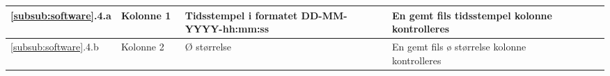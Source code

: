 \begin{center}
\begin{longtable}{ | m{1.785cm} | m{1.785cm}| m{1.785cm}| m{1.785cm}| m{1.785cm}| m{1.785cm}|m{1.785cm}| }
			\hline	
			
						\ref{subsub:software}.4.a
			& 
Kolonne 1 \
   & 
Tidsstempel i formatet DD-MM-YYYY-hh:mm:ss 
    &
     En gemt fils tidsstempel kolonne kontrolleres
    &  & & \\
			\hline	
			
			\hline	
			
						\ref{subsub:software}.4.b
			& 
Kolonne 2 \
   & 
Ø størrelse
    &
     En gemt fils ø størrelse kolonne kontrolleres
    &  & & \\
			\hline	
				
			
			
			
			
\end{longtable}
		
	\end{center}
	\pagebreak